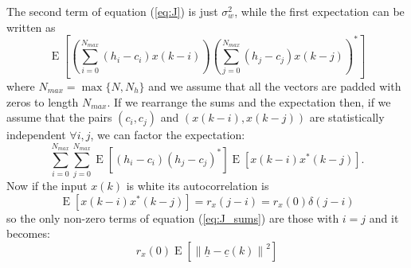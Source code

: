 \documentclass{article}
\renewcommand{\vec}[1]{\underline{#1}}
\newcommand{\E}[1]{\operatorname{E}\left[#1\right]}
\newcommand{\norm}[1]{\left\lVert#1\right\rVert}
\begin{document}
The second term of equation (\ref{eq:J}) is just $\sigma^2_w$, while
the first expectation can be written as
\[ \E{
  \left(\sum_{i=0}^{N_{max}}\left(h_i - c_i\right)x(k-i)\right)
  \left(\sum_{j=0}^{N_{max}}\left(h_j - c_j\right)x(k-j)\right)^* } \]
where $N_{max} = \max\{N, N_h\}$ and we assume that all the vectors
are padded with zeros to length $N_{max}$.  If we rearrange the sums
and the expectation then, {\color{red} if we assume that the pairs
  $(c_i,c_j)$ and $(x(k-i),x(k-j))$ are statistically independent
  $\forall i,j$}, we can factor the expectation:
\begin{equation}
\sum_{i=0}^{N_{max}}\sum_{j=0}^{N_{max}}
\E{(h_i -c_i)(h_j-c_j)^*}
\E{x(k-i)x^*(k-j)} .
\label{eq:J_sums}
\end{equation}
Now if the input $x(k)$ is white its autocorrelation is
\[
\E{x(k-i)x^*(k-j)} = r_x(j-i) = r_x(0)\delta(j-i)
\]
so the only non-zero terms of equation (\ref{eq:J_sums}) are those
with $i=j$ and it becomes:
\begin{equation}
  r_x(0)\E{\norm{\vec{h}-\vec{c}(k)}^2}
  \label{eq:J_final_diff}
\end{equation}
\end{document}

